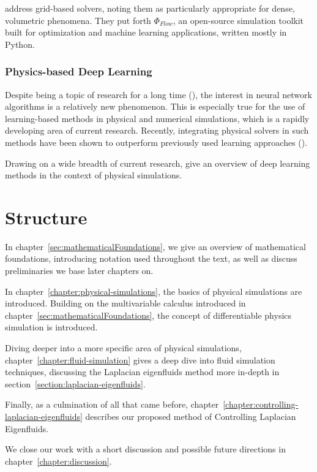\cite{holl2019pdecontrol} address grid-based solvers, noting them as
particularly appropriate for dense, volumetric phenomena. They put forth
$\Phi_{Flow}$, an open-source simulation toolkit built for optimization and
machine learning applications, written mostly in Python.

\subsubsection*{Physics-based Deep Learning}
Despite being a topic of research for a long time (\cite{backprop}), the
interest in neural network algorithms is a relatively new phenomenon. This is
especially true for the use of learning-based methods in physical and numerical
simulations, which is a rapidly developing area of current research. Recently,
integrating physical solvers in such methods have been shown to outperform
previously used learning approaches (\cite{solver-in-the-loop}).

Drawing on a wide breadth of current research, \cite{pbdl} give an overview of
deep learning methods in the context of physical simulations. 

\section{Structure}
In chapter~\ref{sec:mathematicalFoundations}, we give an overview of
mathematical foundations, introducing notation used throughout the text, as well
as discuss  preliminaries we base later chapters on. 

In chapter~\ref{chapter:physical-simulations}, the basics of physical
simulations are introduced. Building on the multivariable calculus introduced in
chapter~\ref{sec:mathematicalFoundations}, the concept of differentiable physics
simulation is introduced. 

Diving deeper into a more specific area of physical simulations,
chapter~\ref{chapter:fluid-simulation} gives a deep dive into fluid simulation
techniques, discussing the Laplacian eigenfluids method more in-depth in
section~\ref{section:laplacian-eigenfluids}. 

Finally, as a culmination of all that came before,
chapter~\ref{chapter:controlling-laplacian-eigenfluids} describes our proposed
method of Controlling Laplacian Eigenfluids. 

We close our work with a short discussion and possible future directions in
chapter~\ref{chapter:discussion}.
